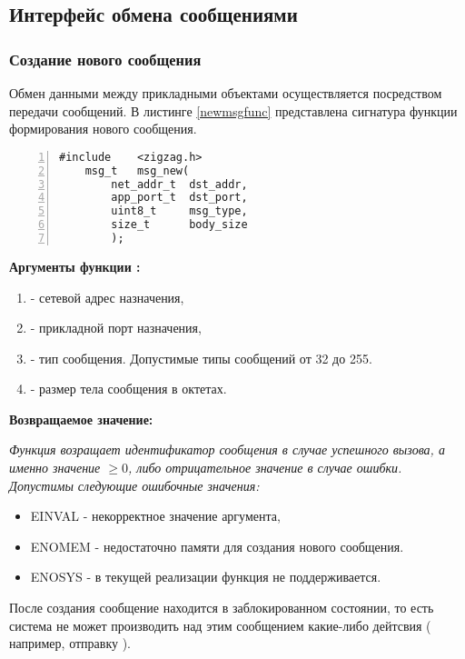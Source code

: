 \subsection{Интерфейс обмена сообщениями}

\subsubsection{Создание нового сообщения}

Обмен данными между прикладными объектами осуществляется посредством передачи сообщений.
В листинге \ref{newmsgfunc} представлена сигнатура функции формирования нового сообщения.

\begin{lstlisting}[caption=Функция \myfunc{msg\_new()} - создание сообщения., label=newmsgfunc, numbers=left, frame=leftline]
    #include    <zigzag.h>
    msg_t   msg_new(
        net_addr_t  dst_addr,
        app_port_t  dst_port,
        uint8_t     msg_type,
        size_t      body_size
        );
\end{lstlisting}

{\bfseries Аргументы функции :}

{\itshape
\begin{enumerate}
\item {} - сетевой адрес назначения,
\item {} - прикладной порт назначения,
\item {} - тип сообщения. Допустимые типы сообщений от 32 до 255.
\item {} - размер тела сообщения в октетах.
\end{enumerate}
}

{\bfseries Возвращаемое значение:}

{\itshape
Функция возращает идентификатор сообщения в случае успешного вызова, а именно значение $\geq 0$, либо
отрицательное значение в случае ошибки. Допустимы следующие ошибочные значения:
\begin{itemize}
\item EINVAL - некорректное значение аргумента,
\item ENOMEM - недостаточно памяти для создания нового сообщения.
\item ENOSYS - в текущей реализации функция не поддерживается.
\end{itemize}
}

После создания сообщение находится в заблокированном состоянии, то есть система \zigzag не
может производить над этим сообщением какие-либо дейтсвия ( например, отправку ). 

